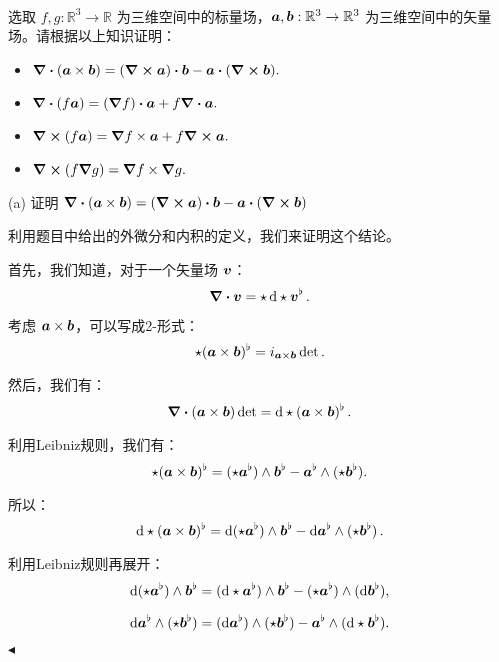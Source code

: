 \documentclass[11pt]{article}
\newenvironment{question}[2][Question]{\begin{trivlist}
\item[\hskip \labelsep {\bfseries #1}\hskip \labelsep {\bfseries #2.}]}{\hfill$\blacktriangleleft$\end{trivlist}}
\newcommand{\RR}{\mathbb{R}}
\begin{document}
    \begin{question}{5 (16') (外微分)}~\\
    选取 $f, g: \RR^3 \to \RR$ 为三维空间中的标量场，$\vb*{a}, \vb*{b}: \RR^3 \to \RR^3$ 为三维空间中的矢量场。请根据以上知识证明：
    \begin{itemize}
        \item [a (4')] $\div(\vb*{a} \times \vb*{b}) = (\curl{\vb*{a}}) \vdot \vb*{b} - \vb*{a} \vdot (\curl{\vb*{b}}).$
        \item [b (4')] $\div(f\vb*{a}) = \qty(\grad f) \vdot \vb*{a} + f\div{\vb*{a}}.$
        \item [c (4')] $\curl(f\vb*{a}) = \grad f \times \vb*{a} + f \curl{\vb*{a}}.$
        \item [d (4')] $\curl(f \grad g) = \grad f \times \grad g.$
    \end{itemize}

     (a) 证明 \(\div(\vb*{a} \times \vb*{b}) = (\curl{\vb*{a}}) \vdot \vb*{b} - \vb*{a} \vdot (\curl{\vb*{b}})\)
    
    利用题目中给出的外微分和内积的定义，我们来证明这个结论。
    
    首先，我们知道，对于一个矢量场 \(\vb*{v}\)：
    \[
    \div \vb*{v} = \star \dd{\star \vb*{v}^\flat}.
    \]
    
    考虑 \(\vb*{a} \times \vb*{b}\)，可以写成2-形式：
    \[
    \star (\vb*{a} \times \vb*{b})^\flat = i_{\vb*{a} \times \vb*{b}} \det.
    \]
    
    然后，我们有：
    \[
    \div (\vb*{a} \times \vb*{b}) \det = \dd{\star (\vb*{a} \times \vb*{b})^\flat}.
    \]
    
    利用Leibniz规则，我们有：
    \[
    \star (\vb*{a} \times \vb*{b})^\flat = (\star \vb*{a}^\flat) \wedge \vb*{b}^\flat - \vb*{a}^\flat \wedge (\star \vb*{b}^\flat).
    \]
    
    所以：
    \[
    \dd{\star (\vb*{a} \times \vb*{b})^\flat} = \dd{(\star \vb*{a}^\flat) \wedge \vb*{b}^\flat} - \dd{\vb*{a}^\flat \wedge (\star \vb*{b}^\flat)}.
    \]
    
    利用Leibniz规则再展开：
    \[
    \dd{(\star \vb*{a}^\flat) \wedge \vb*{b}^\flat} = (\dd{\star \vb*{a}^\flat}) \wedge \vb*{b}^\flat - (\star \vb*{a}^\flat) \wedge (\dd{\vb*{b}^\flat}),
    \]
    
    \[
    \dd{\vb*{a}^\flat \wedge (\star \vb*{b}^\flat)} = (\dd{\vb*{a}^\flat}) \wedge (\star \vb*{b}^\flat) - \vb*{a}^\flat \wedge (\dd{\star \vb*{b}^\flat}).
    \]
    

\end{question}
\end{document}

